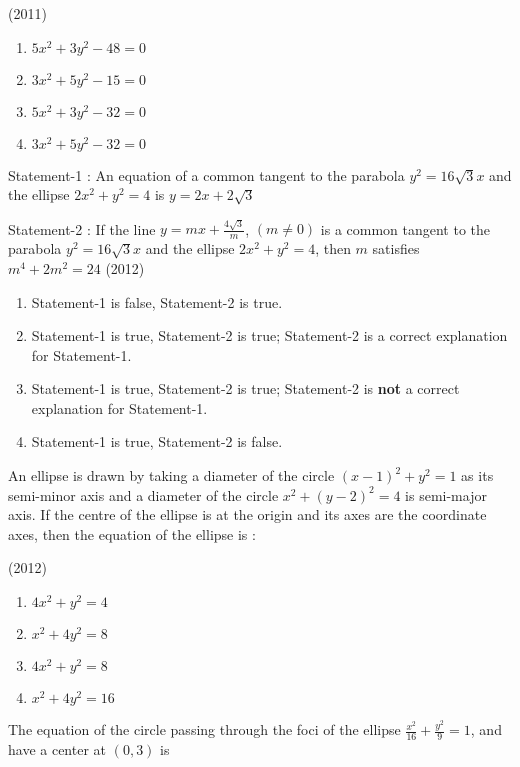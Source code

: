     \hfill(2011)
    
    \begin{enumerate}
    \item$5x^2+3y^2-48=0$
    \item$3x^2+5y^2-15=0$
    \item$5x^2+3y^2-32=0$ 
    \item$3x^2+5y^2-32=0$ 
    \end{enumerate}

    \item
    Statement-1 : An equation of a common tangent to the parabola $y^2=16\sqrt{3}x$ and the ellipse $2x^2+y^2=4$ is $y=2x+2\sqrt{3}$
    
    Statement-2 : If the line $y=mx+\frac{4\sqrt{3}}{m}$, $(m\neq0)$ is a common tangent to the parabola $y^2=16\sqrt{3}x$ and the ellipse $2x^2+y^2=4$, then $m$ satisfies $m^4+2m^2=24$ 
    \hfill(2012)
    \begin{enumerate}
    \item Statement-1 is false, Statement-2 is true.
    \item Statement-1 is true, Statement-2 is true; Statement-2 is a correct explanation for Statement-1.
    \item Statement-1 is true, Statement-2 is true; Statement-2 is \textbf{not} a correct explanation for Statement-1.
    \item Statement-1 is true, Statement-2 is false.
    \end{enumerate}

    \item An ellipse is drawn by taking a diameter of the circle $(x-1)^2+y^2=1$ as its semi-minor axis and a diameter of the circle $x^2+(y-2)^2=4$ is semi-major axis. If the centre of the ellipse is at the origin and its axes are the coordinate axes, then the equation of the ellipse is : 
   
    \hfill(2012)
    
    \begin{enumerate}
    \item$4x^2+y^2=4$
    \item$x^2+4y^2=8$
    \item$4x^2+y^2=8$
    \item$x^2+4y^2=16$ 
    \end{enumerate}

    \item The equation of the circle passing through the foci of the ellipse $\frac{x^2}{16}+\frac{y^2}{9}=1$, and have a center at $(0,3)$ is
    
